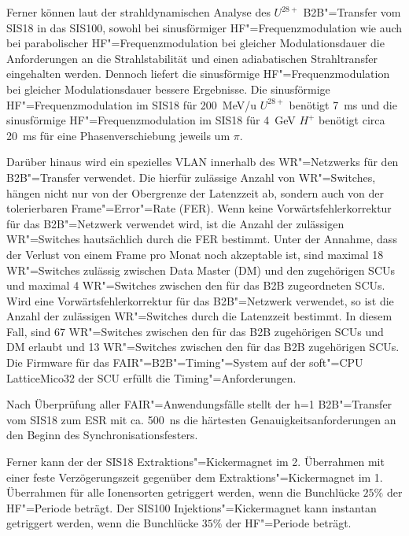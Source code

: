 Ferner k\"onnen laut der strahldynamischen Analyse des $U^\mathit{28+}$ B2B"=Transfer vom SIS18 in das SIS100, sowohl bei sinusf\"ormiger HF"=Frequenzmodulation wie auch bei parabolischer HF"=Frequenzmodulation bei gleicher Modulationsdauer die Anforderungen an die Strahlstabilit\"at und einen adiabatischen Strahltransfer eingehalten werden. Dennoch liefert die sinusf\"ormige HF"=Frequenzmodulation bei gleicher Modulationsdauer bessere Ergebnisse. Die sinusf\"ormige HF"=Frequenzmodulation im SIS18 f\"ur
\SI{200}{MeV/u} $U^\mathit{28+}$ ben\"otigt \SI{7}{\ms} und die sinusf\"ormige HF"=Frequenzmodulation im SIS18 f\"ur \SI{4}{GeV} $H^+$ ben\"otigt circa \SI{20}{\ms} f\"ur eine Phasenverschiebung jeweils um $\pi$. 

Dar\"uber hinaus wird ein spezielles VLAN innerhalb des WR"=Netzwerks f\"ur den B2B"=Transfer verwendet. Die hierf\"ur zul\"assige Anzahl von WR"=Switches, h\"angen nicht nur von der Obergrenze der Latenzzeit ab, sondern auch von der tolerierbaren Frame"=Error"=Rate (FER). Wenn keine Vorw\"artsfehlerkorrektur f\"ur das B2B"=Netzwerk verwendet wird, ist die Anzahl der zul\"assigen WR"=Switches hauts\"achlich durch die FER bestimmt. Unter der Annahme, dass der Verlust von einem Frame pro Monat noch akzeptable ist, sind maximal 18 WR"=Switches zul\"assig zwischen Data Master (DM) und den zugeh\"origen SCUs und maximal 4 WR"=Switches zwischen den f\"ur das B2B zugeordneten SCUs. Wird eine Vorw\"artsfehlerkorrektur f\"ur das B2B"=Netzwerk verwendet, so ist die Anzahl der zul\"assigen WR"=Switches durch die Latenzzeit bestimmt. In diesem Fall, sind 67 WR"=Switches zwischen den f\"ur das B2B zugeh\"origen SCUs  und DM erlaubt und 13 WR"=Switches zwischen den f\"ur das B2B zugeh\"origen SCUs. Die Firmware f\"ur das FAIR"=B2B"=Timing"=System auf der soft"=CPU LatticeMico32 der SCU erf\"ullt die Timing"=Anforderungen. 

Nach \"Uberpr\"ufung aller FAIR"=Anwendungsf\"alle stellt der h=1 B2B"=Transfer vom SIS18 zum ESR mit ca. \SI{500}{\ns} die h\"artesten Genauigkeitsanforderungen an den Beginn des Synchronisationsfesters. 

Ferner kann der der SIS18 Extraktions"=Kickermagnet im 2. \"Uberrahmen mit einer feste Verz\"ogerungszeit gegen\"uber dem Extraktions"=Kickermagnet im 1. \"Uberrahmen  f\"ur alle Ionensorten getriggert werden, wenn die Bunchl\"ucke $25\%$ der HF"=Periode betr\"agt. Der SIS100 Injektions"=Kickermagnet kann instantan getriggert werden, wenn die Bunchl\"ucke $35\%$ der HF"=Periode betr\"agt. 

